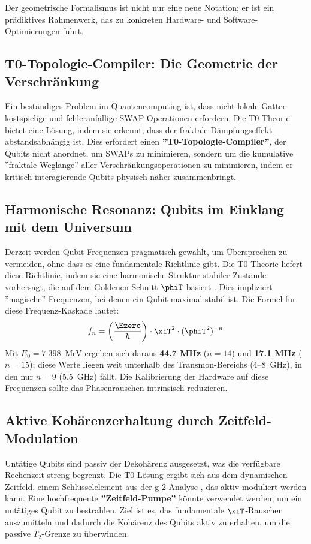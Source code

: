 	Der geometrische Formalismus ist nicht nur eine neue Notation; er ist ein prädiktives Rahmenwerk, das zu konkreten Hardware- und Software-Optimierungen führt.
	
	\subsection{T0-Topologie-Compiler: Die Geometrie der Verschränkung}
	Ein beständiges Problem im Quantencomputing ist, dass nicht-lokale Gatter kostspielige und fehleranfällige SWAP-Operationen erfordern. Die T0-Theorie bietet eine Lösung, indem sie erkennt, dass der fraktale Dämpfungseffekt \cite{pascher:ml_addendum} abstandsabhängig ist. Dies erfordert einen \textbf{''T0-Topologie-Compiler''}, der Qubits nicht anordnet, um SWAPs zu minimieren, sondern um die kumulative ''fraktale Weglänge'' aller Verschränkungsoperationen zu minimieren, indem er kritisch interagierende Qubits physisch näher zusammenbringt.
	
	\subsection{Harmonische Resonanz: Qubits im Einklang mit dem Universum}
	Derzeit werden Qubit-Frequenzen pragmatisch gewählt, um Übersprechen zu vermeiden, ohne dass es eine fundamentale Richtlinie gibt. Die T0-Theorie liefert diese Richtlinie, indem sie eine harmonische Struktur stabiler Zustände vorhersagt, die auf dem Goldenen Schnitt $\phiT$ basiert \cite{pascher:ml_addendum}. Dies impliziert ''magische'' Frequenzen, bei denen ein Qubit maximal stabil ist. Die Formel für diese Frequenz-Kaskade lautet:
	\begin{equation}
		f_n = \left( \frac{\Ezero}{h} \right) \cdot \xiT^2 \cdot (\phiT^2)^{-n}
	\end{equation}
	Mit $E_0 = 7.398$~MeV ergeben sich daraus \textbf{44.7 MHz} ($n=14$) und \textbf{17.1 MHz} ($n=15$); diese Werte liegen weit unterhalb des Transmon-Bereichs (4--8~GHz), in den nur $n = 9$ (5.5~GHz) fällt. Die Kalibrierung der Hardware auf diese Frequenzen sollte das Phasenrauschen intrinsisch reduzieren.
	
	\subsection{Aktive Kohärenzerhaltung durch Zeitfeld-Modulation}
	Untätige Qubits sind passiv der Dekohärenz ausgesetzt, was die verfügbare Rechenzeit streng begrenzt. Die T0-Lösung ergibt sich aus dem dynamischen Zeitfeld, einem Schlüsselelement aus der g-2-Analyse \cite{pascher:g2_rev9}, das aktiv moduliert werden kann. Eine hochfrequente \textbf{''Zeitfeld-Pumpe''} könnte verwendet werden, um ein untätiges Qubit zu bestrahlen. Ziel ist es, das fundamentale $\xiT$-Rauschen auszumitteln und dadurch die Kohärenz des Qubits aktiv zu erhalten, um die passive $T_2$-Grenze zu überwinden.
	
